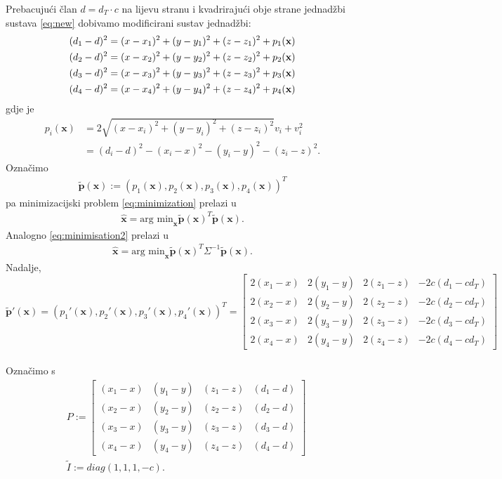 \documentclass[a4paper,twoside,12pt]{memoir} %
\begin{document}
Prebacujući član $d=d_T \cdot c$ na lijevu stranu i kvadrirajući obje strane
jednadžbi sustava \ref{eq:new} dobivamo modificirani sustav jednadžbi:
\begin{align}\label{eq:newIzvedba}
(d_1-d)^2 = (x-x_1)^{2}+(y-y_1)^{2}+(z-z_1)^{2} + p_1(\textbf{x})\notag \\
(d_2-d)^2 = (x-x_2)^{2}+(y-y_2)^{2}+(z-z_2)^{2} + p_2(\textbf{x})\\
(d_3-d)^2 = (x-x_3)^{2}+(y-y_3)^{2}+(z-z_3)^{2} + p_3(\textbf{x})\notag \\
(d_4-d)^2 = (x-x_4)^{2}+(y-y_4)^{2}+(z-z_4)^{2} + p_4(\textbf{x})\notag
\end{align}
gdje je 
\begin{align*}
p_i(\textbf{x}) & = 2\sqrt{(x-x_i)^{2}+(y-y_i)^{2}+(z-z_i)^{2}}v_i + v_i^2 \\
& = (d_i-d)^2 - (x_i-x)^{2} - (y_i-y)^{2} - (z_i-z)^{2}.
\end{align*}
Označimo 
\begin{align*} \mathbf{\tilde{p}}(\mathbf{x}) := (p_1(\textbf{x}),p_2(\textbf{x}),p_3(\textbf{x}),p_4(\textbf{x}))^T
\end{align*}
pa minimizacijski problem \ref{eq:minimization} prelazi u
\begin{align}\label{eq:minimisation3}
\hat{\mathbf{x}} = \text{arg min}_\mathbf{x} \mathbf{\tilde{p}}(\mathbf{x})^T\mathbf{\tilde{p}}(\mathbf{x}).
\end{align}
Analogno \ref{eq:minimisation2} prelazi u 
\begin{align}\label{eq:minimisation4}
\hat{\mathbf{x}} = \text{arg min}_\mathbf{x} \mathbf{\tilde{p}}(\mathbf{x})^T \Sigma ^{-1}\mathbf{\tilde{p}}(\mathbf{x}).
\end{align}
\vspace{0.5cm}
Nadalje, $$ \mathbf{\tilde{p}'}(\mathbf{x}) = (p_1'(\textbf{x}),p_2'(\textbf{x}),p_3'(\textbf{x}),p_4'(\textbf{x}))^T 
= \begin{bmatrix}
  2(x_1-x) &  2(y_1-y) &  2(z_1-z) & - 2c(d_1-cd_T)\\
  2(x_2-x) &  2(y_2-y) &  2(z_2-z) & - 2c(d_2-cd_T) \\
  2(x_3-x) &  2(y_3-y) &  2(z_3-z) & - 2c(d_3-cd_T) \\
  2(x_4-x) &  2(y_4-y) &  2(z_4-z) & - 2c(d_4-cd_T) 
\end{bmatrix}
$$
\\Označimo s 
\begin{align*}
& P := \begin{bmatrix}
 (x_1-x) & (y_1-y) & (z_1-z) & (d_1-d) \\
 (x_2-x) & (y_2-y) & (z_2-z) & (d_2-d) \\
 (x_3-x) & (y_3-y) & (z_3-z) & (d_3-d) \\
 (x_4-x) & (y_4-y) & (z_4-z) & (d_4-d) 
\end{bmatrix} \\
& \tilde{I} := diag(1,1,1,-c).
\end{align*}
\end{document}

